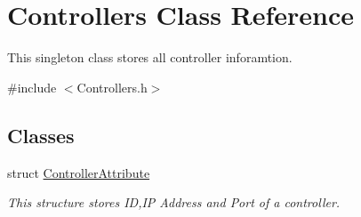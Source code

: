 \hypertarget{classControllers}{\section{\-Controllers \-Class \-Reference}
\label{classControllers}
}


\-This singleton class stores all controller inforamtion.  




{\ttfamily \#include $<$\-Controllers.\-h$>$}

\subsection*{\-Classes}
\begin{DoxyCompactItemize}
\item 
struct \hyperlink{structControllers_1_1ControllerAttribute}{\-Controller\-Attribute}
\begin{DoxyCompactList}\small\item\em \-This structure stores \-I\-D,\-I\-P \-Address and \-Port of a controller. \end{DoxyCompactList}\end{DoxyCompactItemize}
